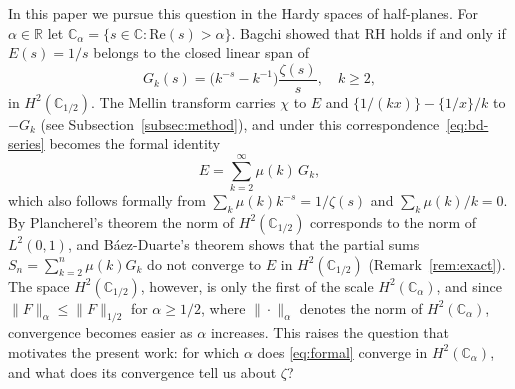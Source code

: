 \documentclass[11pt]{extarticle}
\numberwithin{equation}{section}
\theoremstyle{plain}
\theoremstyle{remark}
\begin{document}
In this paper we pursue this question in the Hardy spaces of half-planes. For
$\alpha \in \mathbb{R}$ let
$\mathbb{C}_\alpha = \{s \in \mathbb{C} : \mathrm{Re}(s) > \alpha\}$. Bagchi
\cite{bagchi} showed that RH holds if and only if $E(s) = 1/s$ belongs to the
closed linear span of
\[
G_k(s) = \bigl(k^{-s} - k^{-1}\bigr)\frac{\zeta(s)}{s}, \quad k \geq 2,
\]
in $H^2(\mathbb{C}_{1/2})$. The Mellin transform carries $\chi$ to $E$ and
$\{1/(kx)\} - \{1/x\}/k$ to $-G_k$ (see Subsection~\ref{subsec:method}), and under
this correspondence~\eqref{eq:bd-series} becomes the formal identity
\begin{equation}\label{eq:formal}
E = \sum_{k=2}^{\infty} \mu(k)\, G_k ,
\end{equation}
which also follows formally from $\sum_{k} \mu(k) k^{-s} = 1/\zeta(s)$ and
$\sum_{k} \mu(k)/k = 0$. By Plancherel's theorem the norm of
$H^2(\mathbb{C}_{1/2})$ corresponds to the norm of $L^2(0,1)$, and Báez-Duarte's
theorem shows that the partial sums $S_n = \sum_{k=2}^{n} \mu(k) G_k$ do not
converge to $E$ in $H^2(\mathbb{C}_{1/2})$ (Remark~\ref{rem:exact}). The space
$H^2(\mathbb{C}_{1/2})$, however, is only the first of the scale
$H^2(\mathbb{C}_\alpha)$, and since $\|F\|_\alpha \leq \|F\|_{1/2}$ for
$\alpha \geq 1/2$, where $\|\cdot\|_\alpha$ denotes the norm of
$H^2(\mathbb{C}_\alpha)$, convergence becomes easier as $\alpha$ increases. This
raises the question that motivates the present work: for which $\alpha$ does
\eqref{eq:formal} converge in $H^2(\mathbb{C}_\alpha)$, and what does its
convergence tell us about $\zeta$?
\end{document}
